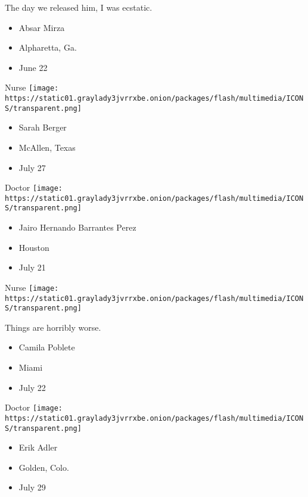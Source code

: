 The day we released him, I was ecstatic.

\begin{itemize}
\tightlist
\item
  Absar Mirza
\item
  Alpharetta, Ga.
\item
  June 22
\end{itemize}

\protect\hyperlink{item-sarah-berger}{}

Nurse
\texttt{[image: https://static01.graylady3jvrrxbe.onion/packages/flash/multimedia/ICONS/transparent.png]}

\begin{itemize}
\tightlist
\item
  Sarah Berger
\item
  McAllen, Texas
\item
  July 27
\end{itemize}

\protect\hyperlink{item-jairo-hernando-barrantes-perez}{}

Doctor
\texttt{[image: https://static01.graylady3jvrrxbe.onion/packages/flash/multimedia/ICONS/transparent.png]}

\begin{itemize}
\tightlist
\item
  Jairo Hernando Barrantes Perez
\item
  Houston
\item
  July 21
\end{itemize}

\protect\hyperlink{item-camila-poblete}{}

Nurse
\texttt{[image: https://static01.graylady3jvrrxbe.onion/packages/flash/multimedia/ICONS/transparent.png]}

Things are horribly worse.

\begin{itemize}
\tightlist
\item
  Camila Poblete
\item
  Miami
\item
  July 22
\end{itemize}

\protect\hyperlink{item-erik-adler}{}

Doctor
\texttt{[image: https://static01.graylady3jvrrxbe.onion/packages/flash/multimedia/ICONS/transparent.png]}

\begin{itemize}
\tightlist
\item
  Erik Adler
\item
  Golden, Colo.
\item
  July 29
\end{itemize}

